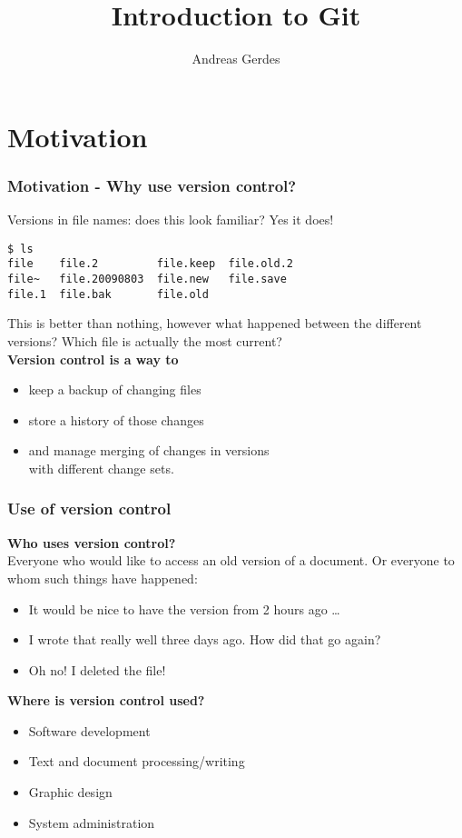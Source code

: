 \documentclass{gittalk}
\title{Introduction to Git}
\author{Andreas Gerdes}
\date{}
\begin{document}

\begin{frame}
  \titlepage
\end{frame}

\section*{Motivation}

\begin{frame}[fragile]
\frametitle{Motivation - Why use version control?}
Versions in file names: does this look familiar? Yes it does!
\begin{lstlisting}
$ ls
file    file.2         file.keep  file.old.2
file~   file.20090803  file.new   file.save
file.1  file.bak       file.old
\end{lstlisting}
This is better than nothing, however what happened between the different
versions?  Which file is actually the most current?\\[1em]
\textbf{Version control is a way to}
\begin{itemize}
  \item keep a backup of changing files
  \item store a history of those changes
  \item and manage merging of changes in versions\\
        with different change sets.
\end{itemize}
\end{frame}

\begin{frame}
\frametitle{Use of version control}
\textbf{Who uses version control?}\\[0.5em]
Everyone who would like to access an old version of a document.  Or everyone
to whom such things have happened:
\begin{itemize}
    \item It would be nice to have the version from 2 hours ago \ldots
    \item I wrote that really well three days ago.  How did that go
        again?
    \item Oh no!  I deleted the file!
\end{itemize}
\vspace*{1em}
\textbf{Where is version control used?}\\[0.5em]
\begin{itemize}
\item Software development
\item Text and document processing/writing
\item Graphic design
\item System administration
\end{itemize}
\end{frame}
\end{document}
